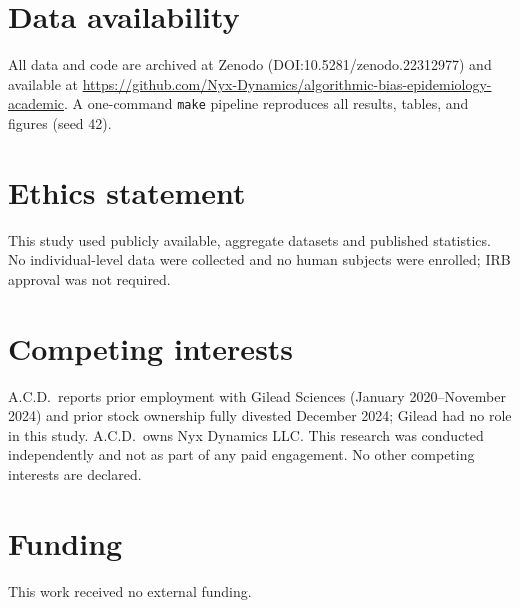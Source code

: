 \documentclass[10pt,letterpaper]{article}
\begin{document}
\section*{Data availability}
All data and code are archived at Zenodo (DOI:10.5281/zenodo.22312977) and available at \url{https://github.com/Nyx-Dynamics/algorithmic-bias-epidemiology-academic}. A one-command \texttt{make} pipeline reproduces all results, tables, and figures (seed 42).

\section*{Ethics statement}
This study used publicly available, aggregate datasets and published statistics. No individual-level data were collected and no human subjects were enrolled; IRB approval was not required.

\section*{Competing interests}
A.C.D.\ reports prior employment with Gilead Sciences (January 2020--November 2024) and prior stock ownership fully divested December 2024; Gilead had no role in this study. A.C.D.\ owns Nyx Dynamics LLC. This research was conducted independently and not as part of any paid engagement. No other competing interests are declared.

\section*{Funding}
This work received no external funding.

\nolinenumbers

\end{document}
